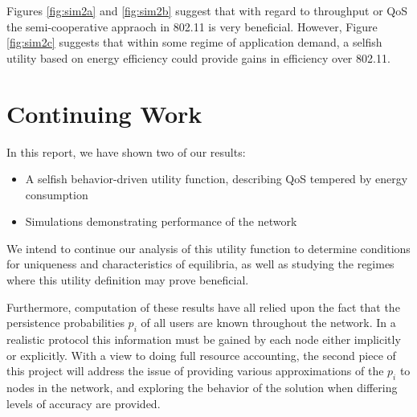 \documentclass[conference]{IEEEtran}
\theoremstyle{definition}
\begin{document}
Figures \ref{fig:sim2a} and \ref{fig:sim2b} suggest that with regard to throughput or QoS the semi-cooperative appraoch in 802.11 is very beneficial. However, Figure \ref{fig:sim2c} suggests that within some regime of application demand, a selfish utility based on energy efficiency could provide gains in efficiency over 802.11.

\section{Continuing Work}
In this report, we have shown two of our results:
\begin{itemize}
  \item A selfish behavior-driven utility function, describing QoS tempered by energy consumption
  \item Simulations demonstrating performance of the network
\end{itemize}

We intend to continue our analysis of this utility function to determine conditions for uniqueness and characteristics of equilibria, as well as studying the regimes where this utility definition may prove beneficial.

Furthermore, computation of these results have all relied upon the fact that the persistence probabilities $p_i$ of all users are known throughout the network.  In a realistic protocol this information must be gained by each node either implicitly or explicitly. With a view to doing full resource accounting, the second piece of this project will address the issue of providing various approximations of the $p_i$ to nodes in the network, and exploring the behavior of the solution when differing levels of accuracy are provided.



\end{document}
